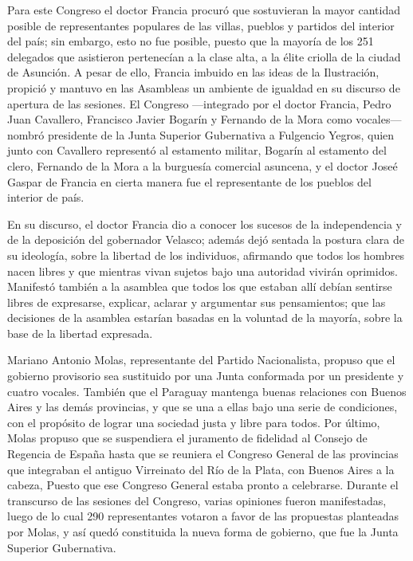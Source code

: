 \documentclass{article}
\begin{document}
Para este Congreso el doctor Francia procuró que sostuvieran la
mayor cantidad posible de representantes populares de las villas,
pueblos y partidos del interior del país; sin embargo, esto no fue
posible, puesto que la mayoría de los 251 delegados que asistieron
pertenecían a la clase alta, a la élite criolla de la ciudad de Asunción. A pesar de ello, Francia imbuido
en las ideas de la Ilustración, propició y mantuvo en las Asambleas 
un ambiente de igualdad en su discurso de apertura de las sesiones. 
El Congreso ---integrado por el doctor Francia, Pedro Juan Cavallero,
Francisco Javier Bogarín y Fernando de la Mora como vocales--- nombró
presidente de la Junta Superior Gubernativa a Fulgencio Yegros, 
quien junto con Cavallero representó al estamento militar, Bogarín 
al estamento del clero, Fernando de la Mora a la burguesía comercial
asuncena, y el doctor Joseé Gaspar de Francia en cierta manera fue
el representante de los pueblos del interior de país. 

En su discurso, el doctor Francia dio a conocer los sucesos de la 
independencia y de la deposición del gobernador Velasco; además dejó
sentada la postura clara de su ideología, sobre la libertad de los 
individuos, afirmando que todos los hombres nacen libres y que 
mientras vivan sujetos bajo una autoridad vivirán oprimidos.
Manifestó también a la asamblea que todos los que estaban allí debían
sentirse libres de expresarse, explicar, aclarar y argumentar sus
pensamientos; que las decisiones de la asamblea estarían basadas en la 
voluntad de la mayoría, sobre la base de la libertad expresada. 

Mariano Antonio Molas, representante del Partido Nacionalista, propuso
que el gobierno provisorio sea sustituido por una Junta conformada por
un presidente y cuatro vocales. También que el Paraguay mantenga buenas
relaciones con Buenos Aires y las demás provincias, y que se una
a ellas bajo una serie de condiciones, con el propósito de lograr una 
sociedad justa y libre para todos. Por último, Molas propuso que se 
suspendiera el juramento de fidelidad al Consejo de Regencia de España
hasta que se reuniera el Congreso General de las provincias que 
integraban el antiguo Virreinato del Río de la Plata, con Buenos Aires
a la cabeza, Puesto que ese Congreso General estaba pronto a celebrarse.
Durante el transcurso de las sesiones del Congreso, varias opiniones
fueron manifestadas, luego de lo cual 290 representantes votaron a favor
de las propuestas planteadas por Molas, y así quedó constituida la nueva
forma de gobierno, que fue la Junta Superior Gubernativa.
\end{document}
